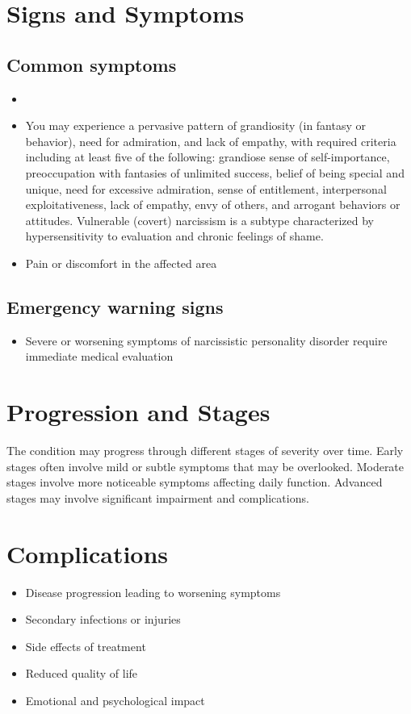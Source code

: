 \section{Signs and Symptoms}
\subsection{Common symptoms}
\begin{itemize}[noitemsep]
  \item \item You may experience a pervasive pattern of grandiosity (in fantasy or behavior), need for admiration, and lack of empathy, with required criteria including at least five of the following: grandiose sense of self-importance, preoccupation with fantasies of unlimited success, belief of being special and unique, need for excessive admiration, sense of entitlement, interpersonal exploitativeness, lack of empathy, envy of others, and arrogant behaviors or attitudes. Vulnerable (covert) narcissism is a subtype characterized by hypersensitivity to evaluation and chronic feelings of shame.
  \item Pain or discomfort in the affected area
  \end{itemize}
\subsection{Emergency warning signs}
\begin{itemize}[noitemsep]
  \item Severe or worsening symptoms of narcissistic personality disorder require immediate medical evaluation
\end{itemize}
\section{Progression and Stages}
The condition may progress through different stages of severity over time. Early stages often involve mild or subtle symptoms that may be overlooked. Moderate stages involve more noticeable symptoms affecting daily function. Advanced stages may involve significant impairment and complications.
\section{Complications}
\begin{itemize}[noitemsep]
  \item Disease progression leading to worsening symptoms
  \item Secondary infections or injuries
  \item Side effects of treatment
  \item Reduced quality of life
  \item Emotional and psychological impact
\end{itemize}

